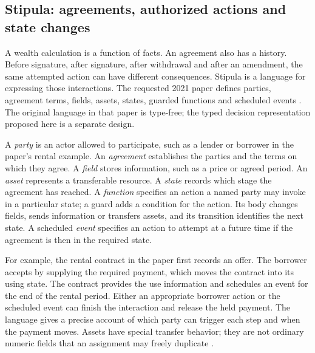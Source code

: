 \subsection{Stipula: agreements, authorized actions and state changes}
\label{sec:stipula-tutorial}

A wealth calculation is a function of facts. An agreement also has a history.
Before signature, after signature, after withdrawal and after an amendment, the
same attempted action can have different consequences. Stipula is a language
for expressing those interactions. The requested 2021 paper defines parties,
agreement terms, fields, assets, states, guarded functions and scheduled events
\citep[secs.~3--4]{stipula2021}. The original language in that paper is
type-free; the typed decision representation proposed here is a separate design.

A \emph{party} is an actor allowed to participate, such as a lender or borrower
in the paper's rental example. An \emph{agreement} establishes the parties and
the terms on which they agree. A \emph{field} stores information, such as a price
or agreed period. An \emph{asset} represents a transferable resource. A
\emph{state} records which stage the agreement has reached. A \emph{function}
specifies an action a named party may invoke in a particular state; a guard
adds a condition for the action. Its body changes fields, sends information or
transfers assets, and its transition identifies the next state. A scheduled
\emph{event} specifies an action to attempt at a future time if the agreement
is then in the required state.

For example, the rental contract in the paper first records an offer. The
borrower accepts by supplying the required payment, which moves the contract
into its using state. The contract provides the use information and schedules
an event for the end of the rental period. Either an appropriate borrower action
or the scheduled event can finish the interaction and release the held payment.
The language gives a precise account of which party can trigger each step and
when the payment moves. Assets have special transfer behavior; they are not
ordinary numeric fields that an assignment may freely duplicate
\citep[sec.~3, rental example and grammar]{stipula2021}.

